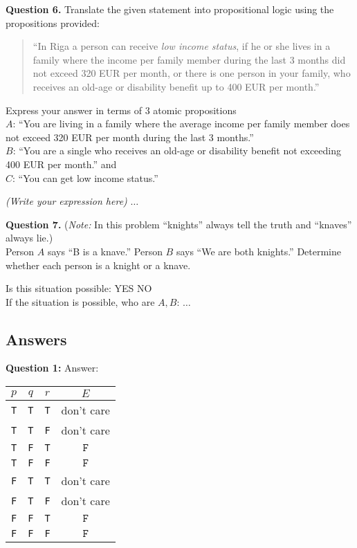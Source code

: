 \documentclass[jou]{apa6}
\begin{document}
\vspace{10pt}
{\bf Question 6.}
Translate the given statement into propositional logic using the propositions provided:
\begin{quote}
``In Riga a person can receive {\em low income status}, 
if he or she lives in a family where the income per family member during the last 3 months did not exceed 320 EUR per month, 
or there is one person in your family, who receives an old-age or disability benefit up to 400 EUR per month.''\\
\end{quote}
Express your answer in terms of $3$ atomic propositions\\
$A$: ``You are living in a family where the average income per family member does not exceed 320 EUR per month during
the last $3$ months.''\\
$B$: ``You are a single who receives an old-age or disability benefit not exceeding 400 EUR per month.'' and\\
$C$: ``You can get low income status.''

\vspace{3pt}
\noindent
{\em (Write your expression here)} $\ldots$


\vspace{10pt}
{\bf Question 7.} 
({\em Note:} In this problem ``knights'' always tell the truth and ``knaves'' always lie.)\\
Person $A$ says ``B is a knave.''
Person $B$ says ``We are both knights.'' Determine whether each person is a knight or a knave.

\vspace{3pt}
\noindent
Is this situation possible: \hspace{5ex} YES \hspace{5ex} NO\\
If the situation is possible, who are $A,B$: $\ldots$


\newpage

\subsection{Answers}

\noindent
{\bf Question 1:} Answer:

\begin{tabular}{ c | c | c | c }
$p$ & $q$ & $r$ & $E$ \\ \hline
{\tt T} & {\tt T} & {\tt T} & don't care \\ \hline
{\tt T} & {\tt T} & {\tt F} & don't care \\ \hline
{\tt T} & {\tt F} & {\tt T} & $\boxed{\mathtt{F}}$  \\ \hline
{\tt T} & {\tt F} & {\tt F} & $\boxed{\mathtt{F}}$  \\ \hline
{\tt F} & {\tt T} & {\tt T} & don't care \\ \hline
{\tt F} & {\tt T} & {\tt F} & don't care \\ \hline
{\tt F} & {\tt F} & {\tt T} & $\boxed{\mathtt{F}}$  \\ \hline
{\tt F} & {\tt F} & {\tt F} & $\boxed{\mathtt{F}}$  \\ \hline
\end{tabular}
\end{document}
